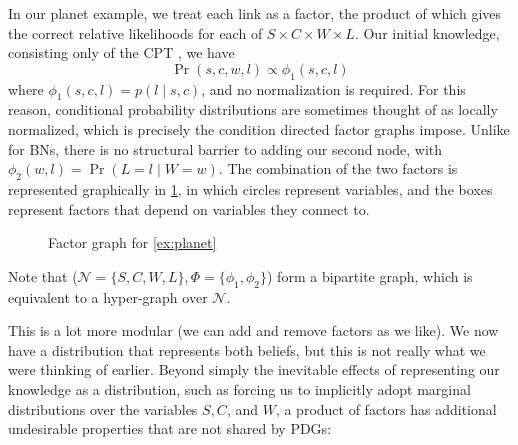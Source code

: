 \documentclass{article}
\newcommand{\MN}{PDG}
\newcommand{\MNs}{\MN s}
\begin{document}
	
	\begin{example}[continues=ex:planet]
		In our planet example, we treat each link as a factor, the product of which gives the correct relative likelihoods for each of $S \times C \times W \times L$. Our initial knowledge, consisting only of the CPT , we have 
		\[ \Pr(s, c, w, l) \propto \phi_1(s,c,l)  \]
		where $\phi_1(s,c,l) = p(l \mid s,c)$, and no normalization is required. For this reason, conditional probability distributions are sometimes thought of as locally normalized, which is precisely the condition directed factor graphs \cite{frey} impose. Unlike for BNs, there is no structural barrier to adding our second node, with $\phi_2(w,l) = \Pr(L\!=\!l\mid W\!=\!w)$. The combination of the two factors is represented graphically in \cref{fig:planet-factorgraph}, in which circles represent variables, and the boxes represent factors that depend on variables they connect to. 
		
		\begin{figure}[h]
			\centering
			\caption{Factor graph for \cref{ex:planet}}
			\label{fig:planet-factorgraph}
		\end{figure}
	 	Note that ($\mathcal N \!=\! \{S,C,W,L\}, \Phi \!=\! \{\phi_1,\phi_2\}$) form a bipartite graph, which is equivalent to a hyper-graph over $\mathcal N$. 
	 	
	 	
	
	\end{example}	
	
	This is a lot more modular (we can add and remove factors as we like). We now have a distribution that represents both beliefs, but this is not really what we were thinking of earlier. Beyond simply the inevitable effects of representing our knowledge as a distribution, such as forcing us to implicitly adopt marginal distributions over the variables $S,C$, and $W$, a product of factors has additional undesirable properties that are not shared by \MNs:
\end{document}

